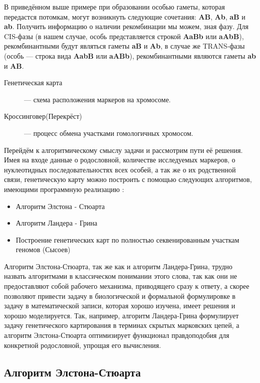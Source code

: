 \documentclass{matmex-diploma-custom}
\begin{document}
В приведённом выше примере при образовании особью гаметы, которая
передастся потомкам, могут возникнуть следующие сочетания:
\textbf{AB}, \textbf{Ab}, \textbf{aB} и \textbf{ab}. Получить
информацию о наличии рекомбинации мы можем, зная фазу. Для CIS-фазы (в
нашем случае, особь представляется строкой \textbf{AaBb} или
\textbf{aAbB}), рекомбинантными будут являться гаметы \textbf{aB} и
\textbf{Ab}, в случае же TRANS-фазы (особь --- строка вида
\textbf{AabB} или \textbf{aABb}), рекомбинантными являются гаметы
\textbf{ab} и \textbf{AB}.

\begin{description}
\item[Генетическая карта] --- схема расположения маркеров на
  хромосоме.
\item[Кроссинговер(Перекрёст)] --- процесс обмена участками
  гомологичных хромосом.
\end{description}

Перейдём к алгоритмическому смыслу задачи и рассмотрим пути её
решения. Имея на входе данные о родословной, количестве исследуемых
маркеров, о нуклеотидных последовательностях всех особей, а так же о
их родственной связи, генетическую карту можно построить с помощью
следующих алгоритмов, имеющими программную реализацию
\cite{fishelson2002exact}:
\begin{itemize}
\item Алгоритм Элстона - Стюарта
\item Алгоритм Ландера - Грина
\item Построение генетических карт по полностью секвенированным
  участкам геномов (Сысоев)
\end{itemize}

Алгоритм Элстона-Стюарта, так же как и алгоритм Ландера-Грина, трудно
назвать алгоритмами в классическом понимании этого слова, так как они
не предоставляют собой рабочего механизма, приводящего сразу к ответу,
а скорее позволяют привести задачу в биологической и формальной
формулировке в задачу в математической записи, которая хорошо изучена,
имеет решения и хорошо моделируется. Так, например, алгоритм
Ландера-Грина формулирует задачу генетического картирования в терминах
скрытых марковских цепей, а алгоритм Элстона-Стюарта оптимизирует
функционал правдоподобия для конкретной родословной, упрощая его
вычисления.

\subsection{Алгоритм Элстона-Стюарта}
\end{document}
